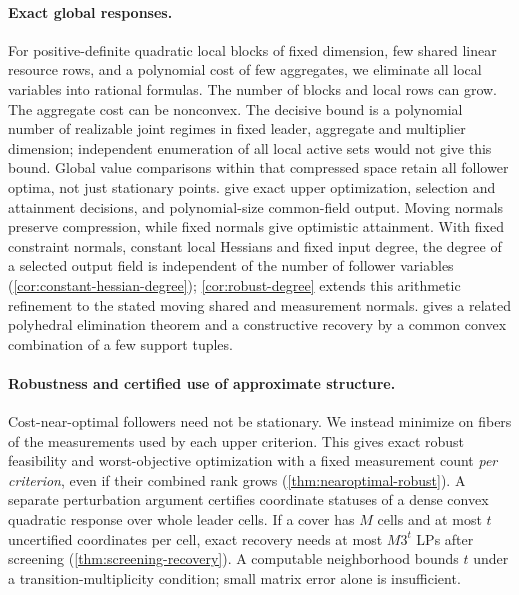 \paragraph{Exact global responses.}
For positive-definite quadratic local blocks of fixed dimension, few shared
linear resource rows, and a polynomial cost of few aggregates, we eliminate
all local variables into rational formulas. The number of blocks and local
rows can grow. The aggregate cost can be nonconvex. The decisive bound is a
polynomial number of realizable joint regimes in fixed leader, aggregate and
multiplier dimension; independent enumeration of all local active sets would
not give this bound. Global value comparisons within that compressed space
retain all follower optima, not just stationary points.
 give exact upper optimization,
selection and attainment decisions, and polynomial-size common-field output.
Moving normals preserve compression, while fixed normals give optimistic
attainment. With fixed constraint normals, constant local Hessians and fixed input degree,
the degree of a selected output field is independent of the number of follower variables
(\cref{cor:constant-hessian-degree}); \cref{cor:robust-degree} extends this
arithmetic refinement to the stated moving shared and measurement normals.
 gives a related polyhedral elimination theorem and a
constructive recovery by a common convex combination of a few support tuples.

\paragraph{Robustness and certified use of approximate structure.}
Cost-near-optimal followers need not be stationary. We instead minimize on
fibers of the measurements used by each upper criterion. This gives exact
robust feasibility and worst-objective optimization with a fixed measurement
count \emph{per criterion}, even if their combined rank grows
(\cref{thm:nearoptimal-robust}). A separate perturbation argument certifies
coordinate statuses of a dense convex quadratic response over whole leader
cells. If a cover has $M$ cells and at most $t$ uncertified coordinates per
cell, exact recovery needs at most $M3^t$ LPs after screening
(\cref{thm:screening-recovery}). A computable neighborhood bounds $t$ under a
transition-multiplicity condition; small matrix error alone is insufficient.

